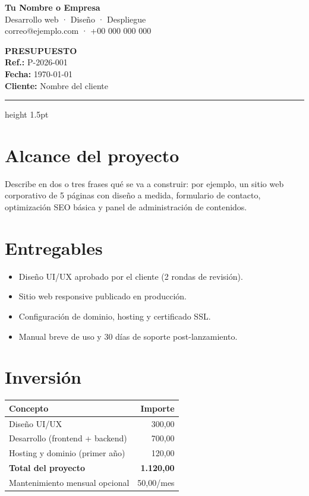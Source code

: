 \documentclass[11pt,a4paper]{article}
\begin{document}
\begin{minipage}[t]{0.58\linewidth}
  {\LARGE\bfseries\color{marca} Tu Nombre o Empresa}\\[2pt]
  Desarrollo web · Diseño · Despliegue\\
  correo@ejemplo.com · +00 000 000 000
\end{minipage}%
\begin{minipage}[t]{0.42\linewidth}
  \begin{flushright}
    {\huge\bfseries\color{marca} PRESUPUESTO}\\[6pt]
    \textbf{Ref.:} P-2026-001\\
    \textbf{Fecha:} \today\\
    \textbf{Cliente:} Nombre del cliente
  \end{flushright}
\end{minipage}

\vspace{0.8em}
{\color{marca}\hrule height 1.5pt}

\section{Alcance del proyecto}
Describe en dos o tres frases qué se va a construir: por ejemplo, un sitio web
corporativo de 5 páginas con diseño a medida, formulario de contacto,
optimización SEO básica y panel de administración de contenidos.

\section{Entregables}
\begin{itemize}
  \item Diseño UI/UX aprobado por el cliente (2 rondas de revisión).
  \item Sitio web responsive publicado en producción.
  \item Configuración de dominio, hosting y certificado SSL.
  \item Manual breve de uso y 30 días de soporte post-lanzamiento.
\end{itemize}

\section{Inversión}
\begin{tabular}{p{8.2cm} r}
  \toprule
  \textbf{Concepto} & \textbf{Importe}\\
  \midrule
  Diseño UI/UX                                   & 300,00\\
  Desarrollo (frontend + backend)                & 700,00\\
  Hosting y dominio (primer año)                 & 120,00\\
  \midrule
  \textbf{Total del proyecto}                    & \textbf{1.120,00}\\
  Mantenimiento mensual opcional                 & 50,00/mes\\
  \bottomrule
\end{tabular}
\end{document}
